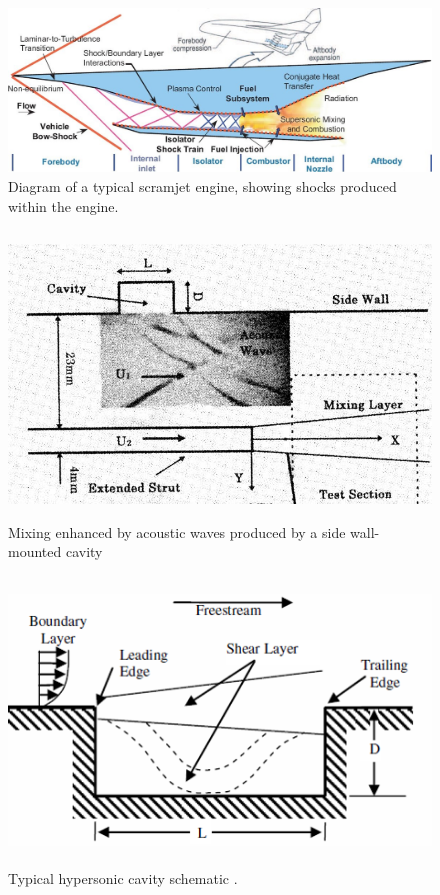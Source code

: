 \newpage

\begin{figure}
\centering
\includegraphics[width=\textwidth]{Figures/scramjet.jpg}
\caption[Scramjet Diagram]{Diagram of a typical scramjet engine, showing shocks produced within the engine. \cite{scramjetFig}}
\label{fig:scramjet}
\end{figure}


\begin{figure}
\centering
\includegraphics[height=3in]{Figures/CavMix.jpg}
\caption[Cavity-Actuated Mixing]{Mixing enhanced by acoustic waves produced by a side wall-mounted cavity \cite{sato1999advanced}}
\label{fig:sato}
\end{figure}

\begin{figure}
\centering
\includegraphics[height=3in]{Figures/CavityDiagram.png}
\caption[Diagram of typical cavity]{Typical hypersonic cavity schematic \cite{lazar2008control}.}
\end{figure}

